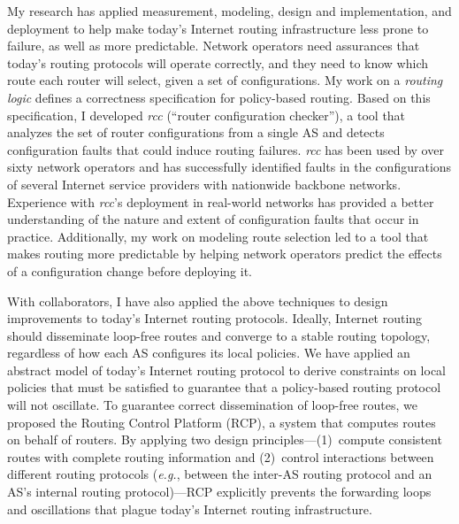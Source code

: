 \documentclass[11pt]{article}
\newcommand{\eg}{{\em e.g.}}
\begin{document}
My research has applied measurement, modeling, design and
implementation, and deployment to help make today's Internet routing
infrastructure less prone to failure, as well as more predictable.
Network operators need assurances that today's routing protocols will
operate correctly, and they need to know which route each router will
select, given a set of configurations.  My work on a {\em routing logic}
defines a correctness specification for policy-based routing.  Based on
this specification, I developed {\em rcc} (``router configuration
checker''), a tool that analyzes the set of router configurations from a
single AS and detects configuration faults that could induce routing
failures.  {\em rcc} has been used by over sixty network operators and
has successfully identified faults in the configurations of several
Internet service providers with nationwide backbone networks.
Experience with {\em rcc}'s deployment in real-world networks has
provided a better understanding of the nature and extent of
configuration faults that occur in practice.  Additionally, my work on
modeling route selection led to a tool that makes routing more
predictable by helping network operators predict the effects of a
configuration change before deploying it.

With collaborators, I have also applied the above techniques to design
improvements to today's Internet routing protocols.  Ideally, Internet
routing should disseminate loop-free routes and converge to a stable
routing topology, regardless of how each AS configures its local
policies.  We have applied an 
abstract model of today's Internet routing protocol to derive
constraints on local policies that must be satisfied to guarantee that a
policy-based routing protocol will not oscillate.  To guarantee correct
dissemination of loop-free routes, we proposed the Routing Control
Platform (RCP), a system that computes routes on behalf of routers.  By
applying two design principles---(1)~compute consistent routes with
complete routing information and (2)~control interactions between
different routing protocols (\eg, between the inter-AS routing protocol
and an AS's internal routing protocol)---RCP explicitly prevents the
forwarding loops and oscillations that plague today's Internet routing
infrastructure. 
\end{document}
